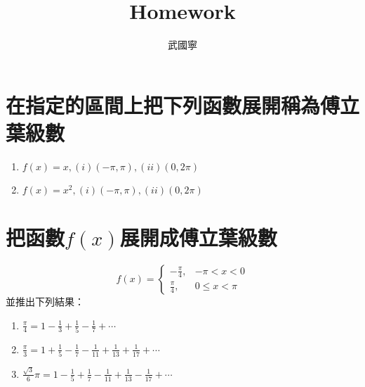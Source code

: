 \documentclass[a4paper,12pt]{article}
\begin{document}
\begin{CJK*}{UTF8}{bsmi}
\newtheorem{theorem}{定理}
\newtheorem{lemma}{引理}
\newtheorem{definition}{定義}
\newtheorem{example}{例子}
\newtheorem{corollary}{推論}
\newtheorem{remark}{注}
\let\oldref\ref
\renewcommand{\ref}[1]{\rm{(\oldref{#1})}}
\renewcommand{\headrulewidth}{0.4pt}
\renewcommand{\footrulewidth}{0.4pt}

\title{Homework}
\author{武國寧}
\date{}
\maketitle
\section{在指定的區間上把下列函數展開稱為傅立葉級數}
    \begin{enumerate}[label={\rm(\arabic*)}]
        \item $\displaystyle f(x) = x, (i)(-\pi, \pi), (ii) (0, 2\pi)$
        \item $\displaystyle f(x) = x^2, (i)(-\pi, \pi), (ii) (0, 2\pi)$
    \end{enumerate}

\section{把函數$f(x)$展開成傅立葉級數}
    \[
        f(x) = \left\{ \begin{array}{cc} -\frac{\pi}{4}, & -\pi < x < 0 \\
                                          \frac{\pi}{4}, &  0 \le x < \pi
                        \end{array}
               \right.
    \]
    並推出下列結果：
    \begin{enumerate}[label={\rm(\arabic*)}]
        \item $\displaystyle \frac{\pi}{4} = 1 - \frac{1}{3} 
               + \frac{1}{5} - \frac{1}{7} + \cdots$
        \item $\displaystyle \frac{\pi}{3} = 1 + \frac{1}{5} 
            - \frac{1}{7} - \frac{1}{11} + \frac{1}{13} 
            +\frac{1}{17} + \cdots$
        \item $\displaystyle \frac{\sqrt{3}}{6}\pi = 1 - \frac{1}{5} 
            + \frac{1}{7} - \frac{1}{11} + \frac{1}{13} - \frac{1}{17}
            +\cdots$
    \end{enumerate}
    

\end{CJK*}
\end{document}
